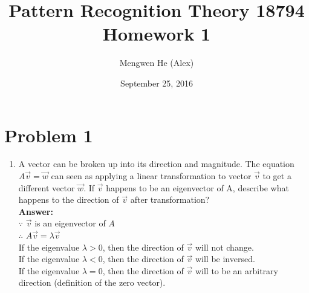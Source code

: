 \documentclass[letterpaper,11pt]{article}
\title{\textbf{Pattern Recognition Theory 18794 Homework 1}}
\author{Mengwen He (Alex)}
\date{September 25, 2016}
\begin{document}
\maketitle

\section*{Problem 1}

\begin{enumerate}
\item A vector can be broken up into its direction and magnitude. The equation
$A\vec{v} = \vec{w}$ can seen as applying a linear transformation to vector $\vec{v}$ to get a
different vector $\vec{w}$. If $\vec{v}$ happens to be an eigenvector of A, describe what
happens to the direction of $\vec{v}$ after transformation?\\
\textbf{Answer:}\\
$\because$ $\vec{v}$ is an eigenvector of $A$\\
$\therefore$ $A \vec{v} = \lambda \vec{v}$\\
If the eigenvalue $\lambda > 0$, then the direction of $\vec{v}$ will not change.\\
If the eigenvalue $\lambda < 0$, then the direction of $\vec{v}$ will be inversed.\\
If the eigenvalue $\lambda = 0$, then the direction of $\vec{v}$ will to be an arbitrary direction (definition of the zero vector).


\end{enumerate}
\end{document}
